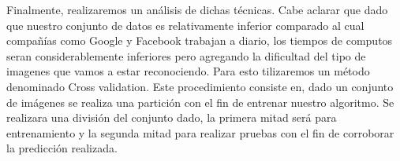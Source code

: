 Finalmente, realizaremos un análisis de dichas técnicas. Cabe aclarar que dado que nuestro conjunto de datos es relativamente inferior comparado al cual compañías como Google y Facebook trabajan a diario, los tiempos de computos seran considerablemente inferiores pero agregando la dificultad del tipo de imagenes que vamos a estar reconociendo. 
Para esto tilizaremos un método denominado Cross validation. Este procedimiento consiste en, dado un conjunto de imágenes se realiza una partición con el fin de entrenar nuestro algoritmo. Se realizara una división del conjunto dado, la primera mitad será para entrenamiento y la segunda mitad para realizar pruebas con el fin de corroborar la predicción realizada.
